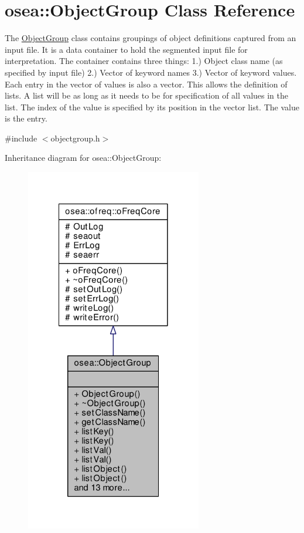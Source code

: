 \hypertarget{classosea_1_1_object_group}{\section{osea\-:\-:Object\-Group Class Reference}
\label{classosea_1_1_object_group}
}


The \hyperlink{classosea_1_1_object_group}{Object\-Group} class contains groupings of object definitions captured from an input file. It is a data container to hold the segmented input file for interpretation. The container contains three things\-: 1.) Object class name (as specified by input file) 2.) Vector of keyword names 3.) Vector of keyword values. Each entry in the vector of values is also a vector. This allows the definition of lists. A list will be as long as it needs to be for specification of all values in the list. The index of the value is specified by its position in the vector list. The value is the entry.  




{\ttfamily \#include $<$objectgroup.\-h$>$}



Inheritance diagram for osea\-:\-:Object\-Group\-:\nopagebreak
\begin{figure}[H]
\begin{center}
\leavevmode
\includegraphics[width=218pt]{classosea_1_1_object_group__inherit__graph}
\end{center}
\end{figure}

